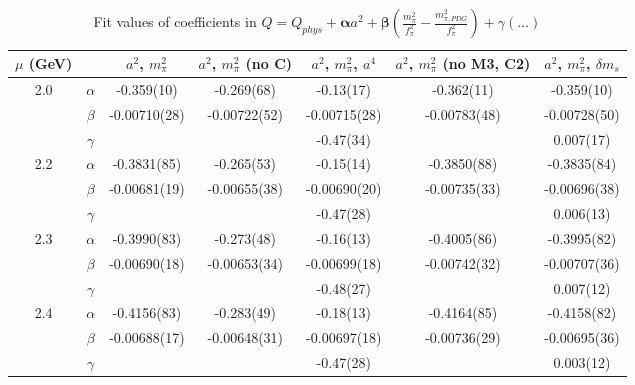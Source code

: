 \documentclass[12pt]{extarticle}
\begin{document}
\begin{table}[h!]
\begin{center}
\begin{tabular}{|c c|c|c|c|c|c|}
\hline
$\mu$ (GeV) &  & $a^2$, $m_\pi^2$& $a^2$, $m_\pi^2$ (no C)& $a^2$, $m_\pi^2$, $a^4$& $a^2$, $m_\pi^2$ (no M3, C2)& $a^2$, $m_\pi^2$, $\delta m_s$\\
\hline
\multirow{3}{0.5in}{2.0} & $\alpha$ & -0.359(10)& -0.269(68)& -0.13(17)& -0.362(11)& -0.359(10)\\
 & $\beta$ & -0.00710(28)& -0.00722(52)& -0.00715(28)& -0.00783(48)& -0.00728(50)\\
 & $\gamma$ &  &  & -0.47(34)&  & 0.007(17)\\
\hline
\multirow{3}{0.5in}{2.2} & $\alpha$ & -0.3831(85)& -0.265(53)& -0.15(14)& -0.3850(88)& -0.3835(84)\\
 & $\beta$ & -0.00681(19)& -0.00655(38)& -0.00690(20)& -0.00735(33)& -0.00696(38)\\
 & $\gamma$ &  &  & -0.47(28)&  & 0.006(13)\\
\hline
\multirow{3}{0.5in}{2.3} & $\alpha$ & -0.3990(83)& -0.273(48)& -0.16(13)& -0.4005(86)& -0.3995(82)\\
 & $\beta$ & -0.00690(18)& -0.00653(34)& -0.00699(18)& -0.00742(32)& -0.00707(36)\\
 & $\gamma$ &  &  & -0.48(27)&  & 0.007(12)\\
\hline
\multirow{3}{0.5in}{2.4} & $\alpha$ & -0.4156(83)& -0.283(49)& -0.18(13)& -0.4164(85)& -0.4158(82)\\
 & $\beta$ & -0.00688(17)& -0.00648(31)& -0.00697(18)& -0.00736(29)& -0.00695(36)\\
 & $\gamma$ &  &  & -0.47(28)&  & 0.003(12)\\
\hline
\end{tabular}
\caption{Fit values of coefficients in $Q = Q_{phys} + \mathbf{\alpha} a^2 + \mathbf{\beta}\left(\frac{m_\pi^2}{f_\pi^2}-\frac{m_{\pi,PDG}^2}{f_\pi^2}\right) + \gamma(\ldots)$}
\end{center}
\end{table}




















\clearpage
\end{document}
